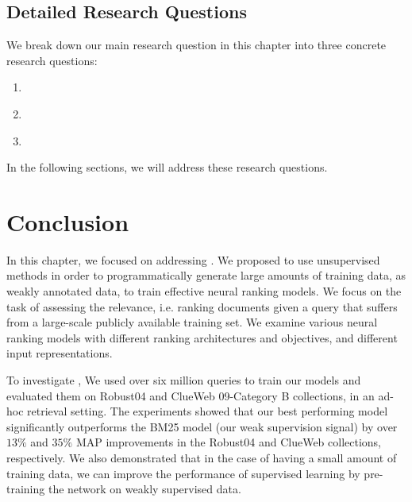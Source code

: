 \subsection{Detailed Research Questions}
We break down our main research question in this chapter into three concrete research questions:
\begin{resqbox}
\begin{enumerate}
\item[\textbf{\resqname{c4.1}}] \emph{}
\item[\textbf{\resqname{c4.2}}] \emph{}
\item[\textbf{\resqname{c4.3}}] \emph{}
\end{enumerate}
\end{resqbox}
In the following sections, we will address these research questions.





\section{Conclusion}
In this chapter, we focused on addressing \textbf{}. 
We proposed to use unsupervised methods in order to programmatically generate large amounts of training data, as weakly annotated data, to train effective neural ranking models. We focus on the task of assessing the relevance, i.e. ranking documents given a query that suffers from a large-scale publicly available training set. We examine various neural ranking models with different ranking architectures and objectives, and different input representations. 

To investigate \textbf{}, We used over six million queries to train our models and evaluated them on Robust04 and ClueWeb 09-Category B collections, in an ad-hoc retrieval setting.  The experiments showed that our best performing model significantly outperforms the BM25 model (our weak supervision signal) by over $13\%$ and $35\%$ MAP improvements in the Robust04 and ClueWeb collections, respectively. 
We also demonstrated that in the case of having a small amount of training data, we can improve the performance of supervised learning by pre-training the network on weakly supervised data.

